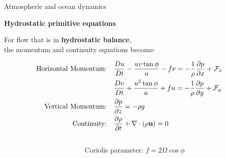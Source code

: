 \documentclass[aspectratio=169,xcolor=dvipsnames]{beamer}
\begin{document}
\begin{frame}[t]{Atmospheric and ocean dynamics}

\vspace{-1.0em}

\begin{center}
\textbf{{\large
Hydrostatic primitive equations
}}
\end{center}

\small 
\center 

\vspace{-0.5em}

For flow that is in \textbf{hydrostatic balance}, \\ the momentum and continuity equations become:

\begin{align*}
\text{Horizontal Momentum:}& \quad 
\frac{Du}{Dt} - \frac{uv \tan\phi}{a} - f v
= -\frac{1}{\rho}\frac{\partial p}{\partial x} + \mathcal{F}_x \\
& \quad 
\frac{Dv}{Dt} + \frac{u^2 \tan\phi}{a} + f u = -\frac{1}{\rho}\frac{\partial p}{\partial y} + \mathcal{F}_y \\
\text{Vertical Momentum:}& \quad
\pdv{p}{z} = -\rho g \\
\text{Continuity:}& \quad 
\pdv{\rho}{t} + \nabla \cdot (\rho \mathbf{u}) = 0 \\
\end{align*}

\begin{columns}
    \begin{column}{0.65\textwidth}
    \end{column}
    \begin{column}{0.35\textwidth}
        \begin{block}{}
            \footnotesize
            \begin{center}
            Coriolis parameter: $f = 2\Omega\cos\phi $
            \end{center}
        \end{block}

    \end{column}
\end{columns}

\end{frame}
\end{document}
